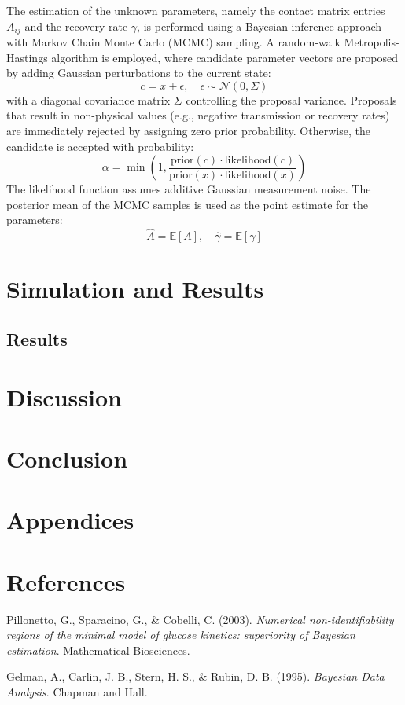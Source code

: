 \documentclass[a4paper,10pt]{report}
\begin{document}
The estimation of the unknown parameters, namely the contact matrix entries $A_{ij}$ and the recovery rate $\gamma$, is performed using a Bayesian inference approach with Markov Chain Monte Carlo (MCMC) sampling. A random-walk Metropolis-Hastings algorithm is employed, where candidate parameter vectors are proposed by adding Gaussian perturbations to the current state:
\[
c = x + \epsilon, \quad \epsilon \sim \mathcal{N}(0, \Sigma)
\]
with a diagonal covariance matrix $\Sigma$ controlling the proposal variance. Proposals that result in non-physical values (e.g., negative transmission or recovery rates) are immediately rejected by assigning zero prior probability. Otherwise, the candidate is accepted with probability:
\[
\alpha = \min \left(1, \frac{\text{prior}(c) \cdot \text{likelihood}(c)}{\text{prior}(x) \cdot \text{likelihood}(x)} \right)
\]
The likelihood function assumes additive Gaussian measurement noise. The posterior mean of the MCMC samples is used as the point estimate for the parameters:
\[
\hat{A} = \mathbb{E}[A], \quad \hat{\gamma} = \mathbb{E}[\gamma]
\]


\newpage
\section{Simulation and Results}

\subsection{Results}




\section{Discussion}


\section{Conclusion}


\section*{Appendices}


\section*{References}
\begin{thebibliography}{9}

Pillonetto, G., Sparacino, G., \& Cobelli, C. (2003).
\textit{Numerical non-identifiability regions of the minimal model of glucose kinetics: superiority of Bayesian estimation}.
Mathematical Biosciences.

Gelman, A., Carlin, J. B., Stern, H. S., \& Rubin, D. B. (1995).
\textit{Bayesian Data Analysis}.
Chapman and Hall.

\end{thebibliography}
\end{document}
